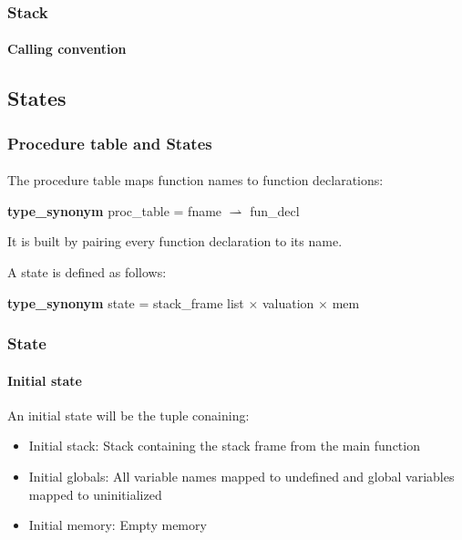 \begin{frame}[fragile]
\frametitle{Stack}
\framesubtitle{Calling convention}


\begin{semiverbatim}
\end{semiverbatim}


\end{frame}

\subsection{States}

\begin{frame}
\frametitle{Procedure table and States}
\framesubtitle{}

The procedure table maps function names to function declarations:
\bigskip

\textbf{type\_synonym} proc\_table = fname $\rightharpoonup$ fun\_decl
\pause
\bigskip

It is built by pairing every function declaration to its name.

\pause
\bigskip

A state is defined as follows:
\bigskip
\pause

\textbf{type\_synonym} state = stack\_frame list $\times$ valuation $\times$ mem


\end{frame}


\begin{frame}
\frametitle{State}
\framesubtitle{Initial state}

An initial state will be the tuple conaining:

\begin{itemize}
\item{Initial stack: Stack containing the stack frame from the main function}
\item{Initial globals: All variable names mapped to undefined and global variables mapped to uninitialized}
\item{Initial memory: Empty memory}
\end{itemize}


\end{frame}


